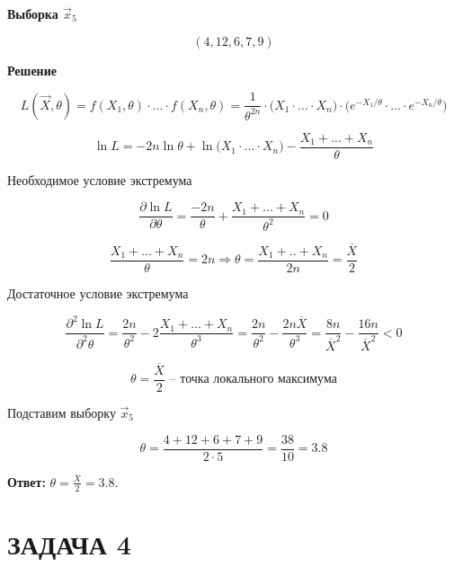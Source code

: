 \textbf{Выборка $\vec x_5$}

\begin{equation*}
    (4, 12, 6, 7, 9)
\end{equation*}

\textbf{Решение}

\begin{equation*}
    L(\vec X, \theta) = f(X_1, \theta) \cdot ... \cdot f(X_n, \theta) = \frac{1}{\theta^{2n}} \cdot \big( X_1 \cdot ... \cdot X_n \big) \cdot \big( e^{-X_1/\theta} \cdot ... \cdot e^{-X_n/\theta} \big)
\end{equation*}

\begin{equation*}
    \ln L = -2n \ln \theta + \ln \big(X_1 \cdot ... \cdot X_n \big) - \frac{X_1 + ... + X_n}{\theta}
\end{equation*}

Необходимое условие экстремума

\begin{equation*}
    \frac{\partial \ln L}{\partial \theta} = \frac{-2n}{\theta} + \frac{X_1 + ... + X_n}{\theta^2} = 0
\end{equation*}

\begin{equation*}
    \frac{X_1 + ... + X_n}{\theta} = 2n \Rightarrow \theta = \frac{X_1 + .. + X_n}{2n} = \frac{\overline X}{2}
\end{equation*}

Достаточное условие экстремума

\begin{equation*}
    \frac{\partial^2 \ln L}{\partial^2 \theta} = \frac{2n}{\theta^2} - 2 \frac{X_1 + ... + X_n}{\theta^3} = \frac{2n}{\theta^2} - \frac{2n \overline X}{\theta^3} = \frac{8n}{\overline X^2} - \frac{16n}{\overline X^2} < 0
\end{equation*}

\begin{equation*}
    \theta = \frac{\overline X}{2} \text{ -- точка локального максимума}
\end{equation*}

Подставим выборку $\vec x_5$

\begin{equation*}
    \theta = \frac{4 + 12 + 6 + 7 + 9}{2 \cdot 5} = \frac{38}{10} = 3.8
\end{equation*}

\textbf{Ответ:} $\theta = \frac{\overline X}{2} = 3.8$.

\section{ЗАДАЧА 4}

